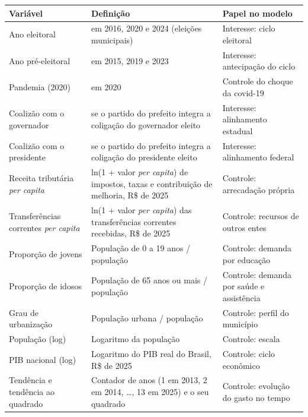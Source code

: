 \begin{quadro}[htbp]
\caption{Variáveis explicativas}\label{qua:explicativas}
\centering
\footnotesize
\begin{tabular}{|>{\raggedright\arraybackslash}p{3.6cm}|>{\raggedright\arraybackslash}p{6.2cm}|>{\raggedright\arraybackslash}p{4.2cm}|}
\hline
\textbf{Variável} & \textbf{Definição} & \textbf{Papel no modelo} \\ \hline
Ano eleitoral & 1 em 2016, 2020 e 2024 (eleições municipais) & Interesse: ciclo eleitoral \\ \hline
Ano pré-eleitoral & 1 em 2015, 2019 e 2023 & Interesse: antecipação do ciclo \\ \hline
Pandemia (2020) & 1 em 2020 & Controle do choque da covid-19 \\ \hline
Coalizão com o governador & 1 se o partido do prefeito integra a coligação do governador eleito & Interesse: alinhamento estadual \\ \hline
Coalizão com o presidente & 1 se o partido do prefeito integra a coligação do presidente eleito & Interesse: alinhamento federal \\ \hline
Receita tributária \textit{per capita} & ln(1 + valor \textit{per capita}) de impostos, taxas e contribuição de melhoria, R\$ de 2025 & Controle: arrecadação própria \\ \hline
Transferências correntes \textit{per capita} & ln(1 + valor \textit{per capita}) das transferências correntes recebidas, R\$ de 2025 & Controle: recursos de outros entes \\ \hline
Proporção de jovens & População de 0 a 19 anos / população & Controle: demanda por educação \\ \hline
Proporção de idosos & População de 65 anos ou mais / população & Controle: demanda por saúde e assistência \\ \hline
Grau de urbanização & População urbana / população & Controle: perfil do município \\ \hline
População (log) & Logaritmo da população & Controle: escala \\ \hline
PIB nacional (log) & Logaritmo do PIB real do Brasil, R\$ de 2025 & Controle: ciclo econômico \\ \hline
Tendência e tendência ao quadrado & Contador de anos (1 em 2013, 2 em 2014, \ldots, 13 em 2025) e o seu quadrado & Controle: evolução do gasto no tempo \\ \hline
\end{tabular}
\end{quadro}

